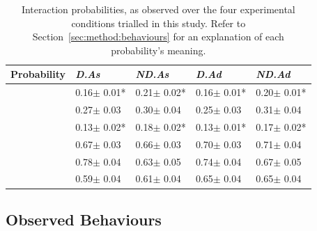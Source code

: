 \begin{table}[t!]
    \caption{Interaction probabilities, as observed over the four experimental conditions trialled in this study. Refer to Section~\ref{sec:method:behaviours} for an explanation of each probability's meaning.}
    \label{tbl_probabilities}
    \renewcommand{\arraystretch}{1.4}
    \begin{center}
    \begin{small}
    \begin{tabulary}{\textwidth}{L{3.2cm}||D{1.6cm}|D{1.6cm}|D{1.6cm}|D{1.6cm}}
   
   \hline
    
    \textbf{Probability} & \textbf{\emph{D.As}} & \textbf{\emph{ND.As}} & \textbf{\emph{D.Ad}} & \textbf{\emph{ND.Ad}} \\ \hline\hline
     & 0.16$\pm$ 0.01* & 0.21$\pm$ 0.02* & 0.16$\pm$ 0.01* & 0.20$\pm$ 0.01* \\ \hline
     & 0.27$\pm$ 0.03 & 0.30$\pm$ 0.04 & 0.25$\pm$ 0.03 & 0.31$\pm$ 0.04 \\ \hline
     & 0.13$\pm$ 0.02* & 0.18$\pm$ 0.02* & 0.13$\pm$ 0.01* & 0.17$\pm$ 0.02* \\ \hline\hline
     & 0.67$\pm$ 0.03 & 0.66$\pm$ 0.03 & 0.70$\pm$ 0.03 & 0.71$\pm$ 0.04 \\ \hline
     & 0.78$\pm$ 0.04 & 0.63$\pm$ 0.05 & 0.74$\pm$ 0.04 & 0.67$\pm$ 0.05 \\ \hline
     & 0.59$\pm$ 0.04 & 0.61$\pm$ 0.04 & 0.65$\pm$ 0.04 & 0.65$\pm$ 0.04 \\ \hline
    \end{tabulary}
    \end{small}
    \end{center}
\end{table}

\subsection{Observed Behaviours}
